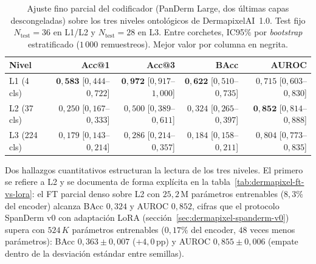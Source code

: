 \begin{table}[H]
\centering
\footnotesize
\setlength{\tabcolsep}{4pt}
\renewcommand{\arraystretch}{0.95}
\caption{Ajuste fino parcial del codificador (PanDerm Large, dos
últimas capas descongeladas) sobre los tres niveles ontológicos de
DermapixelAI~1.0. Test fijo $N_{\mathrm{test}} = 36$ en L1/L2 y
$N_{\mathrm{test}} = 28$ en L3. Entre corchetes, IC95\% por
\emph{bootstrap} estratificado ($1\,000$ remuestreos). Mejor valor
por columna en negrita.}
\label{tab:dermapixel-ft-multilevel}
\begin{tabular}{lrrrr}
\hline
Nivel        & Acc@1                            & Acc@3                            & BAcc                             & AUROC \\
\hline
L1 (4 cls)   & $\mathbf{0{,}583}$ [$0{,}444$--$0{,}722$] & $\mathbf{0{,}972}$ [$0{,}917$--$1{,}000$] & $\mathbf{0{,}622}$ [$0{,}510$--$0{,}735$] & $0{,}715$ [$0{,}603$--$0{,}830$] \\
L2 (37 cls)  & $0{,}250$ [$0{,}167$--$0{,}333$] & $0{,}500$ [$0{,}389$--$0{,}611$] & $0{,}324$ [$0{,}265$--$0{,}397$] & $\mathbf{0{,}852}$ [$0{,}814$--$0{,}888$] \\
L3 (224 cls) & $0{,}179$ [$0{,}143$--$0{,}214$] & $0{,}286$ [$0{,}214$--$0{,}357$] & $0{,}184$ [$0{,}158$--$0{,}211$] & $0{,}804$ [$0{,}773$--$0{,}835$] \\
\hline
\end{tabular}
\end{table}

Dos hallazgos cuantitativos estructuran la lectura de los tres
niveles. El primero se refiere a L2 y se documenta de forma
explícita en la tabla~\ref{tab:dermapixel-ft-vs-lora}: el FT
parcial denso sobre L2 con $25{,}2$\,M parámetros entrenables
($8{,}3\%$ del encoder) alcanza BAcc $0{,}324$ y AUROC
$0{,}852$, cifras que el protocolo SpanDerm v0 con adaptación LoRA
(secci\'on~\ref{sec:dermapixel-spanderm-v0}) supera con
$524\,K$ parámetros entrenables ($0{,}17\%$ del encoder, $48$
veces menos parámetros): BAcc $0{,}363 \pm 0{,}007$
($+4{,}0$\,pp) y AUROC $0{,}855 \pm 0{,}006$ (empate dentro de
la desviación estándar entre semillas).

